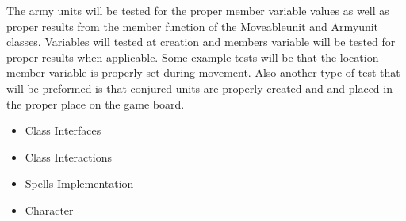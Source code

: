 {\color{black}

The army units will be tested for the proper member variable values as well as proper results from the member function of the Moveableunit and Armyunit classes. Variables will tested at creation and members variable will be tested for proper results when applicable. Some example tests will be that the location member variable is properly set during movement. Also another type of test that will be preformed is that conjured units are properly created and and placed in the proper place on the game board. 
}

{\color{black}
\begin{itemize}
\item Class Interfaces
\item Class Interactions
\item Spells Implementation
\item Character 
\end{itemize}
}

